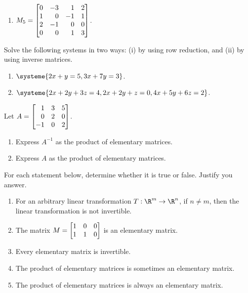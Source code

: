 \begin{exercises}
\begin{problist}
\begin{enumerate}
			\item $M_{5} = \mat{0&-3&1&2\\1&0&-1&1\\2&-1&0&0\\0&0&1&3}$.
		\end{enumerate}
		
		\prob Solve the following systems in two ways: (i) by using row reduction,
		and (ii) by using inverse matrices.
		\begin{enumerate}
			\item $\systeme{2x+y=5,3x+7y=3}$.

			\item $\systeme{2x+2y+3z=4,2x+2y+z=0, 4x+5y+6z=2}$.
		\end{enumerate}

		\prob Let $A=\mat{1&3&5\\0&2&0\\-1&0&2}$.
		\begin{enumerate}
			\item Express $A^{-1}$ as the product of elementary matrices.

			\item Express $A$ as the product of elementary matrices.
		\end{enumerate}

		\prob For each statement below, determine whether it is true or false. Justify you answer.
		\begin{enumerate}
			\item For an arbitrary linear transformation $T:\R^{m}\to\R^{n}$,
				if $n \neq m$, then the linear transformation is
				not invertible.

			\item The matrix $M = \mat{1&0&0\\1&1&0}$ is an elementary
				matrix.
			\item Every elementary matrix is invertible.
			\item The product of elementary matrices is sometimes an elementary matrix.
			\item The product of elementary matrices is always an elementary matrix.
		\end{enumerate}
	\end{problist}
\end{exercises}
